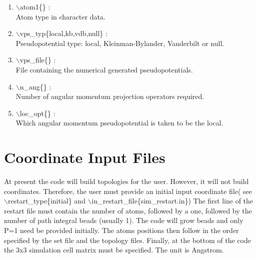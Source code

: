 \documentclass[12pt]{article}
\begin{document}
\begin{enumerate}

 \vspace{0.15in} 
 \item  $\backslash$atom1\{\} : \\
    Atom type in character data.

 \vspace{0.15in} 
 \item  $\backslash$vps\_typ\{local,kb,vdb,null\} : \\
    Pseudopotential type: local, Kleinman-Bylander, Vanderbilt or null.

 \vspace{0.15in} 
 \item  $\backslash$vps\_file\{\} : \\
    File containing the numerical generated pseudopotentials.

 \vspace{0.15in} 
 \item  $\backslash$n\_ang\{\} : \\
    Number of angular momentum projection operators required.

 \vspace{0.15in} 
 \item  $\backslash$loc\_opt\{\} : \\
    Which angular momentum pseudopotential is taken to be the local.

\end{enumerate}

\newpage

\section*{\bf Coordinate Input Files} 

At present the code will build topologies for the user. However,
it will not build coordinates. Therefore, the user must provide
an initial input coordinate file( see $\backslash$restart\_type\{initial\}
and $\backslash$in\_restart\_file\{sim\_restart.in\})
The first line of the restart file must contain the number of atoms,
followed by a one, followed by the number of path integral beads 
(usually 1). The code will grow beads and only P=1 need be provided
initially. The atoms positions then follow in the order specified by
the set file and the topology files. Finally, at the bottom of
the code the 3x3 simulation cell matrix must be specified.
The unit is Angstrom.
\end{document}
